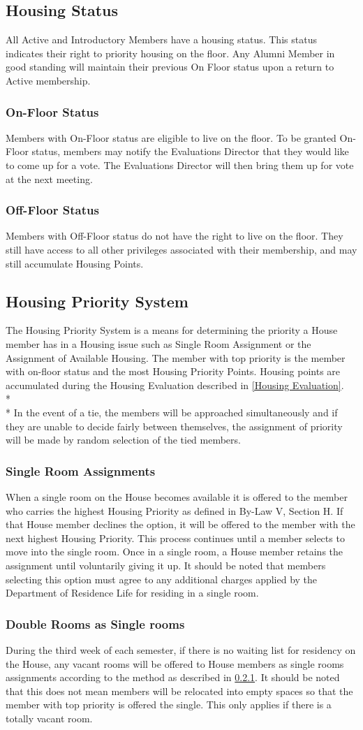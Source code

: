 \documentclass{article}
\newcommand{\bsection}[1]{\subsection{#1} \label{#1}}
\newcommand{\bsubsection}[1]{\subsubsection{#1} \label{#1}}
\begin{document}
\bsection{Housing Status}
All Active and Introductory Members have a housing status.
This status indicates their right to priority housing on the floor.
Any Alumni Member in good standing will maintain their previous On Floor status upon a return to Active membership.
\bsubsection{On-Floor Status}
Members with On-Floor status are eligible to live on the floor.
To be granted On-Floor status, members may notify the Evaluations Director that they would like to come up for a vote.
The Evaluations Director will then bring them up for vote at the next meeting.
\bsubsection{Off-Floor Status}
Members with Off-Floor status do not have the right to live on the floor.
They still have access to all other privileges associated with their membership, and may still accumulate Housing Points.

\bsection{Housing Priority System}
The Housing Priority System is a means for determining the priority a House member has in a Housing issue such as Single Room Assignment or the Assignment of Available Housing.
The member with top priority is the member with on-floor status and the most Housing Priority Points.
Housing points are accumulated during the Housing Evaluation described in \ref{Housing Evaluation}.
\\* \\*
In the event of a tie, the members will be approached simultaneously and if they are unable to decide fairly between themselves, the assignment of priority will be made by random selection of the tied members.
\bsubsection{Single Room Assignments}
When a single room on the House becomes available it is offered to the member who carries the highest Housing Priority as defined in By-Law V, Section H.
If that House member declines the option, it will be offered to the member with the next highest Housing Priority.
This process continues until a member selects to move into the single room.
Once in a single room, a House member retains the assignment until voluntarily giving it up.
It should be noted that members selecting this option must agree to any additional charges applied by the Department of Residence Life for residing in a single room.
\bsubsection{Double Rooms as Single rooms}
During the third week of each semester, if there is no waiting list for residency on the House, any vacant rooms will be offered to House members as single rooms assignments according to the method as described in \ref{Single Room Assignments}.
It should be noted that this does not mean members will be relocated into empty spaces so that the member with top priority is offered the single.
This only applies if there is a totally vacant room.
\end{document}
